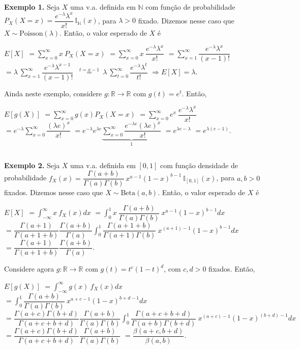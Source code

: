 \documentclass[
]{book}
\begin{document}
\textbf{Exemplo 1.} Seja \(X\) uma v.a. definida em \(\mathbb{N}\) com função de probabilidade \(P_X(X=x)=\dfrac{e^{-\lambda}\lambda^x}{x!}~\mathbb{I}_{\mathbb{N}}(x)\), para \(\lambda>0\) fixado. Dizemos nesse caso que \(X \sim \text{Poisson}(\lambda)\). Então, o valor esperado de \(X\) é

\(E\left[X\right]\) \(=\displaystyle\sum_{x=0}^\infty x~P_X(X=x)\)
\(=\displaystyle\sum_{x=0}^\infty x~\dfrac{e^{-\lambda}\lambda^x}{x!}\)
\(=\displaystyle\sum_{x=1}^\infty \dfrac{e^{-\lambda}\lambda^x}{(x-1)!}\)
\(=\displaystyle\lambda~\sum_{x=1}^\infty \dfrac{e^{-\lambda}\lambda^{x-1}}{(x-1)!}\)
\(~\overset{t=x-1}{=}~\displaystyle\lambda~\sum_{t=0}^\infty \dfrac{e^{-\lambda}\lambda^{t}}{t!}\)
\(\Longrightarrow E\left[X\right] = \lambda\).

Ainda neste exemplo, considere \(g:\mathbb{R}\rightarrow\mathbb{R}\) com \(g(t) = e^t\). Então,

\(E\left[g(X)\right]\) \(=\displaystyle\sum_{x=0}^\infty g(x)P_X(X=x)\) \(=\displaystyle\sum_{x=0}^\infty e^x~\dfrac{e^{-\lambda}\lambda^x}{x!}\) \(=\displaystyle e^{-\lambda}\sum_{x=0}^\infty \dfrac{(\lambda e)^x}{x!}\) \(=\displaystyle e^{-\lambda}e^{\lambda e}\underbrace{\sum_{x=0}^{\infty} \dfrac{e^{-\lambda e}(\lambda e)^x}{x!}}_{1}\)
\(=e^{\lambda e-\lambda}\) \(=e^{\lambda(e-1)}\).

\(~\)

\textbf{Exemplo 2.} Seja \(X\) uma v.a. definida em \([0,1]\) com função densidade de probabilidade \(f_X(x)=\dfrac{\Gamma(a+b)}{\Gamma(a)\Gamma(b)}~x^{a-1}(1-x)^{b-1}~\mathbb{I}_{[0,1]}(x)\), para \(a,b>0\) fixados. Dizemos nesse caso que \(X \sim \text{Beta}(a,b)\). Então, o valor esperado de \(X\) é

\(E[X]\) \(=\displaystyle\int_{-\infty}^\infty x~f_X(x)dx\)
\(=\displaystyle\int_0^1 x~\dfrac{\Gamma(a+b)}{\Gamma(a)\Gamma(b)}~x^{a-1}(1-x)^{b-1}dx\)
\(=\displaystyle\dfrac{\Gamma (a+1)}{\Gamma(a+1+b)}\dfrac{\Gamma(a+b)}{\Gamma(a)}\int_0^1\dfrac{\Gamma(a+1+b)}{\Gamma(a+1)\Gamma(b)}~x^{(a+1)-1}(1-x)^{b-1}dx\)
\(=\dfrac{\Gamma (a+1)}{\Gamma(a+1+b)}\dfrac{\Gamma(a+b)}{\Gamma(a)}\).

Considere agora \(g:\mathbb{R}\rightarrow\mathbb{R}\) com \(g(t) = t^c(1-t)^d\), com \(c,d>0\) fixados. Então,

\(E[g(X)]\) \(=\displaystyle\int_{-\infty}^\infty g(x)~f_X(x)dx\)
\(=\displaystyle\int_0^1 \dfrac{\Gamma(a+b)}{\Gamma(a)\Gamma(b)}~x^{a+c-1}(1-x)^{b+d-1}dx\)
\(=\displaystyle\dfrac{\Gamma (a+c)\Gamma(b+d)}{\Gamma(a+c+b+d)}\dfrac{\Gamma(a+b)}{\Gamma(a)\Gamma(b)}\int_0^1\dfrac{\Gamma(a+c+b+d)}{\Gamma(a+b)\Gamma(b+d)}~x^{(a+c)-1}(1-x)^{(b+d)-1}dx\)
\(=\dfrac{\Gamma(a+c)\Gamma(b+d)}{\Gamma(a+c+b+d)}\dfrac{\Gamma(a+b)}{\Gamma(a)\Gamma(b)}\)
\(=\dfrac{\beta(a+c,b+d)}{\beta(a,b)}\).
\end{document}
